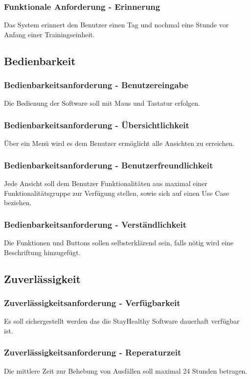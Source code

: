 \documentclass[12pt,a4paper,onecolumn]{article}
\begin{document}
\subsubsection{Funktionale Anforderung - Erinnerung}
Das System erinnert den Benutzer einen Tag und nochmal eine Stunde vor Anfang einer Trainingseinheit.

\subsection{Bedienbarkeit}
\subsubsection{Bedienbarkeitsanforderung - Benutzereingabe}
Die Bedienung der Software soll mit Maus und Tastatur erfolgen.
\subsubsection{Bedienbarkeitsanforderung - Übersichtlichkeit}
Über ein Menü wird es dem Benutzer ermöglicht alle Ansichten zu erreichen.
\subsubsection{Bedienbarkeitsanforderung - Benutzerfreundlichkeit}
Jede Ansicht soll dem Benutzer Funktionalitäten aus maximal einer Funktionalitätsgruppe zur Verfügung stellen, sowie sich auf einen Use Case beziehen.
\subsubsection{Bedienbarkeitsanforderung - Verständlichkeit}
Die Funktionen und Buttons sollen selbsterklärend sein, falls nötig wird eine Beschriftung hinzugefügt.

\subsection{Zuverlässigkeit}
\subsubsection{Zuverlässigkeitsanforderung - Verfügbarkeit}
Es soll sichergestellt werden das die StayHealthy Software dauerhaft verfügbar ist.
\subsubsection{Zuverlässigkeitsanforderung - Reperaturzeit}
Die mittlere Zeit zur Behebung von Ausfällen soll maximal 24 Stunden betragen.
\end{document}
